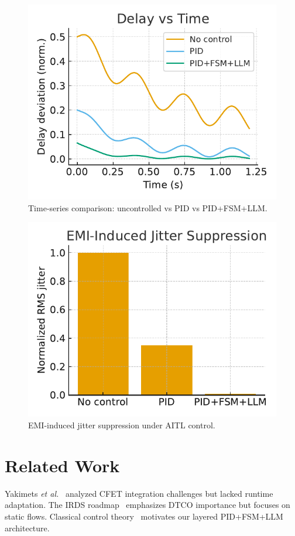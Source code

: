 \documentclass[conference]{IEEEtran}
\begin{document}
\begin{figure}[h]
\centering
\includegraphics[width=0.85\columnwidth]{delay_comp.pdf}
\caption{Time-series comparison: uncontrolled vs PID vs PID+FSM+LLM.}
\label{fig:delay}
\end{figure}

\begin{figure}[h]
\centering
\includegraphics[width=0.85\columnwidth]{emi_jitter.pdf}
\caption{EMI-induced jitter suppression under AITL control.}
\label{fig:emi}
\end{figure}

\section{Related Work}
Yakimets \textit{et al.}~\cite{yakimets2020cfet} analyzed CFET integration challenges but lacked runtime adaptation.
The IRDS roadmap~\cite{irds2023} emphasizes DTCO importance but focuses on static flows.
Classical control theory~\cite{franklin2015feedback} motivates our layered PID+FSM+LLM architecture.
\end{document}
